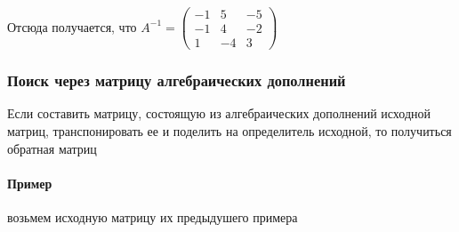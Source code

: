 \documentclass[class=article,a4paper,12pt,crop=false]{standalone}
\begin{document}
Отсюда получается, что $A^{-1} = \begin{pmatrix}
    -1 & 5 & -5 \\ -1 & 4 & -2 \\ 1 & -4 & 3
\end{pmatrix}$

\subsubsection{Поиск через матрицу алгебраических дополнений}

Если составить матрицу, состоящую из алгебраических дополнений исходной матриц, транспонировать ее и
поделить на определитель исходной, то получиться обратная матриц

\paragraph{Пример} возьмем исходную матрицу их предыдушего примера
\end{document}
